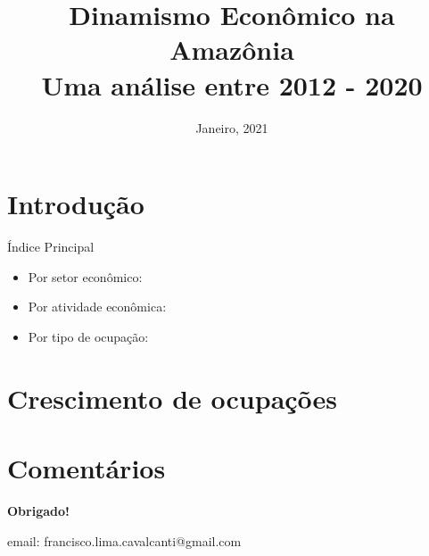 \documentclass[10pt]{beamer}
\date{Janeiro, 2021}
\title{Dinamismo Econômico na Amazônia \\ Uma análise entre 2012 - 2020}
\begin{document}

\begin{frame}
\titlepage
\end{frame}


\section{Introdução}

\begin{frame}[label=indice_principal]{Índice Principal}


\begin{itemize}
\item{Por setor econômico: \hyperlink{table1taxadecrescimentondeocupadosporsetor}{}}
\item{Por atividade econômica: \hyperlink{table1taxadecrescimentondeocupadosporatividade}{}}
\item{Por tipo de ocupação: \hyperlink{table1taxadecrescimentondeocupadosportipodeocupacao}{}}

\end{itemize}


\end{frame}

\section{Crescimento de ocupações}

\begin{frame}
\textit{\hyperlink{indice_principal}{}}

\end{frame}


\begin{frame}
\textit{\hyperlink{indice_principal}{}}

\end{frame}


\begin{frame}
\textit{\hyperlink{indice_principal}{}}

\end{frame}



\section{Comentários}


\frame
{
    \begin{center}
     \vfill
    \textbf{Obrigado!}
     \\

     \begin{small}
     email: francisco.lima.cavalcanti@gmail.com
     \end{small}
     \vfill
\end{center}
}
\end{document}
